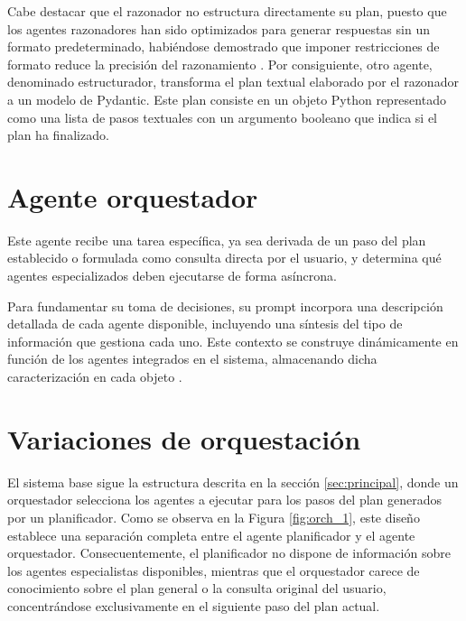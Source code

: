 Cabe destacar que el razonador no estructura directamente su plan, puesto que los agentes razonadores han sido optimizados para generar respuestas sin un formato predeterminado, habiéndose demostrado que imponer restricciones de formato reduce la precisión del razonamiento \cite{tam_let_2024}. Por consiguiente, otro agente, denominado estructurador, transforma el plan textual elaborado por el razonador a un modelo de Pydantic. Este plan consiste en un objeto Python representado como una lista de pasos textuales con un argumento booleano que indica si el plan ha finalizado.

\section{Agente orquestador}
\label{sec:agente_orquestador}
Este agente recibe una tarea específica, ya sea derivada de un paso del plan establecido o formulada como consulta directa por el usuario, y determina qué agentes especializados deben ejecutarse de forma asíncrona.

Para fundamentar su toma de decisiones, su prompt incorpora una descripción detallada de cada agente disponible, incluyendo una síntesis del tipo de información que gestiona cada uno. Este contexto se construye dinámicamente en función de los agentes integrados en el sistema, almacenando dicha caracterización en cada objeto .

\section{Variaciones de orquestación}
\label{sec:vars}
El sistema base sigue la estructura descrita en la sección \ref{sec:principal}, donde un orquestador selecciona los agentes a ejecutar para los pasos del plan generados por un planificador. Como se observa en la Figura \ref{fig:orch_1}, este diseño establece una separación completa entre el agente planificador y el agente orquestador. Consecuentemente, el planificador no dispone de información sobre los agentes especialistas disponibles, mientras que el orquestador carece de conocimiento sobre el plan general o la consulta original del usuario, concentrándose exclusivamente en el siguiente paso del plan actual.


